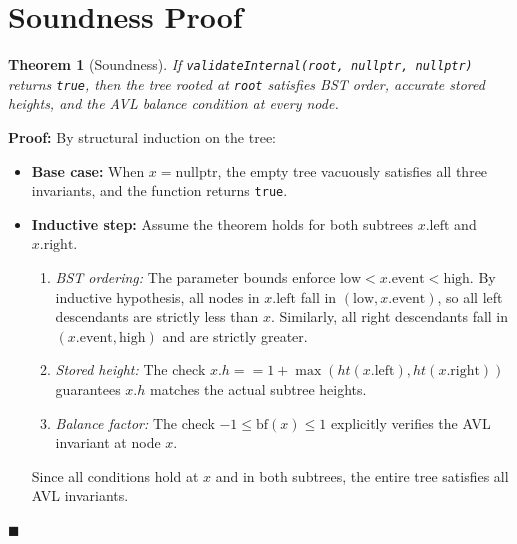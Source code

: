 \documentclass[11pt,a4paper]{article}
\newtheorem{theorem}{Theorem}
\newenvironment{proof}{\noindent\textbf{Proof:}\enspace}{\hfill$\blacksquare$\par\medskip}
\begin{document}
\section{Soundness Proof}
\begin{theorem}[Soundness]
If \texttt{validateInternal(root, nullptr, nullptr)} returns \texttt{true}, then the tree rooted at \texttt{root} satisfies BST order, accurate stored heights, and the AVL balance condition at every node.
\end{theorem}
\begin{proof}
By structural induction on the tree:
\begin{itemize}
    \item \textbf{Base case:} When $x = \text{nullptr}$, the empty tree vacuously satisfies all three invariants, and the function returns \texttt{true}.
    \item \textbf{Inductive step:} Assume the theorem holds for both subtrees $x.\text{left}$ and $x.\text{right}$.
    \begin{enumerate}
        \item \textit{BST ordering:} The parameter bounds enforce $\text{low} < x.\text{event} < \text{high}$. By inductive hypothesis, all nodes in $x.\text{left}$ fall in $(\text{low}, x.\text{event})$, so all left descendants are strictly less than $x$. Similarly, all right descendants fall in $(x.\text{event}, \text{high})$ and are strictly greater.
        \item \textit{Stored height:} The check $x.h == 1 + \max(ht(x.\text{left}), ht(x.\text{right}))$ guarantees $x.h$ matches the actual subtree heights.
        \item \textit{Balance factor:} The check $-1 \le \text{bf}(x) \le 1$ explicitly verifies the AVL invariant at node $x$.
    \end{enumerate}
    Since all conditions hold at $x$ and in both subtrees, the entire tree satisfies all AVL invariants.
\end{itemize}
\end{proof}
\end{document}
